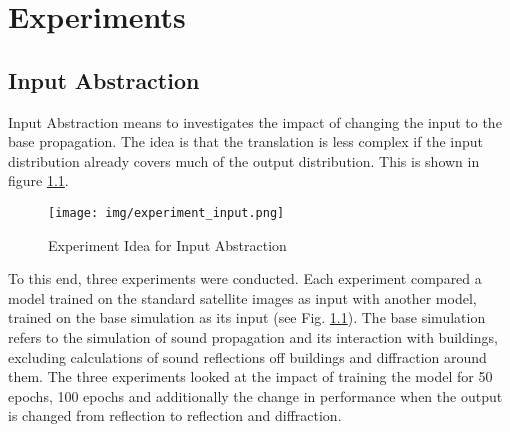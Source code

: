 \chapter{Experiments}
\label{cha:experiments}



	\section{Input Abstraction}
	\label{sec:experiments-input-abstraction}
		Input Abstraction means to investigates the impact of changing the input to the base propagation. The idea is that the translation is less complex if the input distribution already covers much of the output distribution. This is shown in figure \ref{fig:experiment_input}.
		\begin{figure}[H]
			\centering
			\texttt{[image: img/experiment\_input.png]}
			\caption[Experiment Idea for Input Abstraction]{Experiment Idea for Input Abstraction}
			\label{fig:experiment_input}
		\end{figure}
		\FloatBarrier
		To this end, three experiments were conducted. Each experiment compared a model trained on the standard satellite images as input with another model, trained on the base simulation as its input (see Fig. \ref{fig:experiment_input}). The base simulation refers to the simulation of sound propagation and its interaction with buildings, excluding calculations of sound reflections off buildings and diffraction around them. \newpage
		The three experiments looked at the impact of training the model for 50 epochs, 100 epochs and additionally the change in performance when the output is changed from reflection to reflection and diffraction.
		
